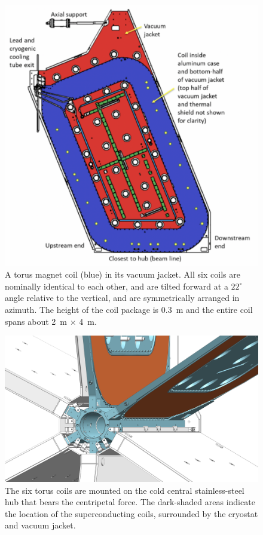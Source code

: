 \documentclass[final,3p]{elsarticle}
\begin{document}
\begin{twocolumn}
\begin{figure}[th!]
\centerline{\includegraphics[width=1.0\columnwidth]{Torus-coil.png}}
\caption{A torus magnet coil (blue) in its vacuum jacket. All six coils are nominally identical to each other, and are
  tilted forward at a $22^\circ$ angle relative to the vertical, and are symmetrically arranged in azimuth. The height
  of the coil package is 0.3~m and the entire coil spans about 2~m $\times$ 4~m.}
\label{coil-shape}
\end{figure}

\begin{figure}[th!]
\centerline{\includegraphics[width=1.00\columnwidth]{torus-hub-2.png}}
\caption{The six torus coils are mounted on the cold central stainless-steel hub that bears the centripetal force. The
dark-shaded areas indicate the location of the superconducting coils, surrounded by the cryostat and vacuum jacket.}
\label{coil-mount}
\end{figure}


\end{twocolumn}
\end{document}
